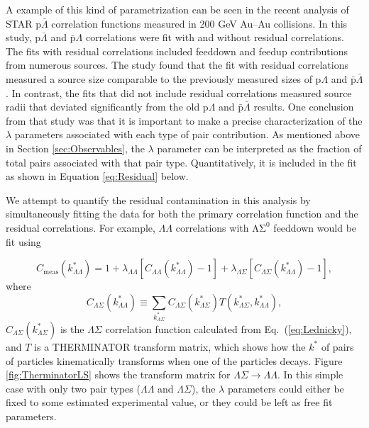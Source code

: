 A example of this kind of parametrization can be seen in the recent analysis \cite{Kisiel:2014mma} of STAR p$\bar{\Lambda}$ correlation functions measured in 200 GeV Au--Au collisions.  In this study, p$\bar{\Lambda}$ and $\bar{\mathrm{p}}\Lambda$ correlations were fit with and without residual correlations.  The fits with residual correlations included feeddown and feedup contributions from numerous sources.  The study found that the fit with residual correlations measured a source size comparable to the previously measured sizes of p$\Lambda$ and $\bar{\mathrm{p}}\bar{\Lambda}$.  In contrast, the fits that did not include residual correlations measured source radii that deviated significantly from the old p$\Lambda$ and $\bar{\mathrm{p}}\bar{\Lambda}$ results.  One conclusion from that study was that it is important to make a precise characterization of the $\lambda$ parameters associated with each type of pair contribution.  As mentioned above in Section \ref{sec:Observables}, the $\lambda$ parameter can be interpreted as the fraction of total pairs associated with that pair type.  Quantitatively, it is included in the fit as shown in Equation \ref{eq:Residual} below.

We attempt to quantify the residual contamination in this analysis by simultaneously fitting the data for both the primary correlation function and the residual correlations.  For example, $\Lambda\Lambda$ correlations with $\mathrm{\Lambda\Sigma^0}$ feeddown would be fit using 

\begin{equation}
\label{eq:Residual}
C_{\mathrm{meas}}(k^*_{\Lambda\Lambda})= 1 + \lambda_{\Lambda\Lambda}[C_{\Lambda\Lambda}(k^*_{\Lambda\Lambda})-1]+\lambda_{\Lambda\Sigma}[C_{\Lambda\Sigma}(k^*_{\Lambda\Lambda})-1],
\end{equation}
where $$C_{\Lambda\Sigma}(k^*_{\Lambda\Lambda}) \equiv \displaystyle\sum\limits_{k^*_{\Lambda\Sigma}}C_{\Lambda\Sigma}(k^*_{\Lambda\Sigma})T(k^*_{\Lambda\Sigma},k^*_{\Lambda\Lambda}),$$ $C_{\Lambda\Sigma}(k^*_{\Lambda\Sigma})$ is the $\Lambda\Sigma$ correlation function calculated from Eq.~(\ref{eq:Lednicky}), and $T$ is a THERMINATOR \cite{Chojnacki:2011hb} transform matrix, which shows how the $k^*$ of pairs of particles kinematically transforms when one of the particles decays.  Figure \ref{fig:TherminatorLS} shows the transform matrix for $\Lambda\Sigma \rightarrow \Lambda\Lambda$.  In this simple case with only two pair types ($\Lambda\Lambda$ and $\Lambda\Sigma$), the $\lambda$ parameters could either be fixed to some estimated experimental value, or they could be left as free fit parameters.

